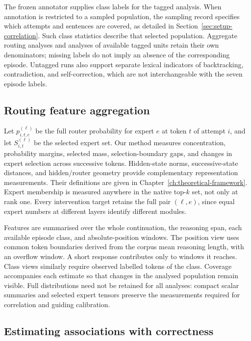 \documentclass[12pt,a4paper,twoside,openright]{book}
\begin{document}
The frozen annotator supplies class labels for the tagged analysis. When
annotation is restricted to a sampled population, the sampling record
specifies which attempts and sentences are covered, as detailed in
Section~\ref{sec:setup-correlation}. Such class statistics
describe that selected population. Aggregate routing analyses and analyses of
available tagged units retain their own denominators; missing labels do not
imply an absence of the corresponding episode. Untagged runs also support
separate lexical indicators of backtracking, contradiction, and
self-correction, which are not interchangeable with the seven episode labels.

\subsection{Routing feature aggregation}

Let $p_{i,t,e}^{(\ell)}$ be the full router probability for expert $e$ at token
$t$ of attempt $i$, and let $S_{i,t}^{(\ell)}$ be the selected expert set.
Our method measures concentration, probability margins, selected mass,
selection-boundary gaps, and changes in expert selection across successive
tokens. Hidden-state norms, successive-state distances, and hidden/router
geometry provide complementary representation measurements. Their definitions
are given in Chapter~\ref{ch:theoretical-framework}. Expert membership is
measured anywhere in the native top-$k$ set, not only at rank one. Every
intervention target retains the full pair $(\ell,e)$, since equal expert
numbers at different layers identify different modules.

Features are summarised over the whole continuation, the reasoning span,
each available episode class, and absolute-position windows. The position
view uses common token boundaries derived from the corpus mean reasoning
length, with an overflow window. A short response contributes only to windows
it reaches. Class views similarly require observed labelled tokens of the
class. Coverage accompanies each estimate so that changes in the analysed
population remain visible. Full distributions need not be retained for all
analyses: compact scalar summaries and selected expert tensors preserve the
measurements required for correlation and guiding calibration.

\subsection{Estimating associations with correctness}
\end{document}
